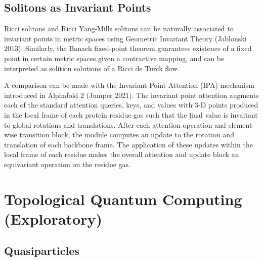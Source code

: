 \documentclass{article}
\begin{document}
    \subsection{Solitons as Invariant Points}
    Ricci solitons and Ricci Yang-Mills solitons can be naturally associated to invariant points in metric spaces using Geometric Invariant Theory (Jablonski 2013).
    Similarly, the Banach fixed-point theorem guarantees existence of a fixed point in certain metric spaces given a contractive mapping, and can be interpreted as solition solutions of a Ricci de Turck flow.
    

    A comparison can be made with the Invariant Point Attention (IPA) mechanism introduced in Alphafold 2 (Jumper 2021). The invariant point attention augments each of the standard attention queries, keys, and values with 3-D points produced in the local frame of each protein residue gas such that the final value is invariant to global rotations and translations. 
    After each attention operation and element-wise transition block, the module computes an update to the rotation and translation of each backbone frame. 
    The application of these updates within the local frame of each residue makes the overall attention and update block an equivariant operation on the residue gas.

    \section{Topological Quantum Computing (Exploratory)}

    
    \subsection{Quasiparticles}
    
\end{document}
